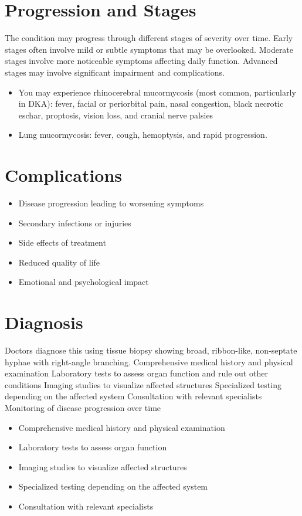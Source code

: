 \section{Progression and Stages}
The condition may progress through different stages of severity over time. Early stages often involve mild or subtle symptoms that may be overlooked. Moderate stages involve more noticeable symptoms affecting daily function. Advanced stages may involve significant impairment and complications.

\begin{itemize}[noitemsep]
  \item You may experience rhinocerebral mucormycosis (most common, particularly in DKA): fever, facial or periorbital pain, nasal congestion, black necrotic eschar, proptosis, vision loss, and cranial nerve palsies
  \item Lung mucormycosis: fever, cough, hemoptysis, and rapid progression.
\end{itemize}
\section{Complications}
\begin{itemize}[noitemsep]
  \item Disease progression leading to worsening symptoms
  \item Secondary infections or injuries
  \item Side effects of treatment
  \item Reduced quality of life
  \item Emotional and psychological impact
\end{itemize}
\section{Diagnosis}
Doctors diagnose this using tissue biopsy showing broad, ribbon-like, non-septate hyphae with right-angle branching. Comprehensive medical history and physical examination Laboratory tests to assess organ function and rule out other conditions Imaging studies to visualize affected structures Specialized testing depending on the affected system Consultation with relevant specialists Monitoring of disease progression over time

\begin{itemize}[noitemsep]
  \item Comprehensive medical history and physical examination
  \item Laboratory tests to assess organ function
  \item Imaging studies to visualize affected structures
  \item Specialized testing depending on the affected system
  \item Consultation with relevant specialists
\end{itemize}
